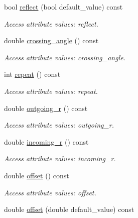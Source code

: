 \begin{DoxyCompactItemize}
bool \hyperlink{struct_d_d4hep_1_1_x_m_l_1_1_child_value_a2a33f9b124b7e7b34ba6249120904e08}{reflect} (bool default\_\-value) const 
\begin{DoxyCompactList}\small\item\em Access attribute values: reflect. \item\end{DoxyCompactList}\item 
double \hyperlink{struct_d_d4hep_1_1_x_m_l_1_1_child_value_a0b3d01727588ba4168694a63a70c7219}{crossing\_\-angle} () const 
\begin{DoxyCompactList}\small\item\em Access attribute values: crossing\_\-angle. \item\end{DoxyCompactList}\item 
int \hyperlink{struct_d_d4hep_1_1_x_m_l_1_1_child_value_ac04ff102c89a9deed658e67d24273ea5}{repeat} () const 
\begin{DoxyCompactList}\small\item\em Access attribute values: repeat. \item\end{DoxyCompactList}\item 
double \hyperlink{struct_d_d4hep_1_1_x_m_l_1_1_child_value_add9e6744daaa29638c5f6404fae3b5e1}{outgoing\_\-r} () const 
\begin{DoxyCompactList}\small\item\em Access attribute values: outgoing\_\-r. \item\end{DoxyCompactList}\item 
double \hyperlink{struct_d_d4hep_1_1_x_m_l_1_1_child_value_a86f942b8a522d942985f5b844fa67157}{incoming\_\-r} () const 
\begin{DoxyCompactList}\small\item\em Access attribute values: incoming\_\-r. \item\end{DoxyCompactList}\item 
double \hyperlink{struct_d_d4hep_1_1_x_m_l_1_1_child_value_a6b764c53aa57278d08eea47caaf073c1}{offset} () const 
\begin{DoxyCompactList}\small\item\em Access attribute values: offset. \item\end{DoxyCompactList}\item 
double \hyperlink{struct_d_d4hep_1_1_x_m_l_1_1_child_value_a1d1191c49d89b4a1876679f55c9468f9}{offset} (double default\_\-value) const 

\end{DoxyCompactItemize}
